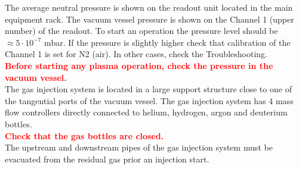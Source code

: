 \documentclass[fleqn,a4paper,20pt]{article}
\begin{document}
\begin{minipage}{.68\textwidth}
	
The average neutral pressure is shown on the readout unit located in the main equipment rack.	The vacuum vessel pressure is shown on the Channel 1 (upper number) of the readout. To start an operation the pressure level should be $\approx 5\cdot 10^{-7}$ mbar. If the pressure is slightly higher check that calibration of the Channel 1 is set for N2 (air). In other cases, check the Troubleshooting.\\

\textcolor{red}{\textbf{Before starting any plasma operation, check the pressure in the vacuum vessel.}}\\

The gas injection system is located in a large support structure close to one of the tangential ports of the vacuum vessel. The gas injection system has 4 mass flow controllers directly connected to helium, hydrogen, argon and deuterium bottles.\\

\textcolor{red}{\textbf{Check that the gas bottles are closed.}}\\

The upstream and downstream pipes of the gas injection system must be evacuated from the residual gas prior an injection start.
\end{minipage}
\begin{minipage}{.02\textwidth}
	$\ $\\
\end{minipage}
\end{document}
